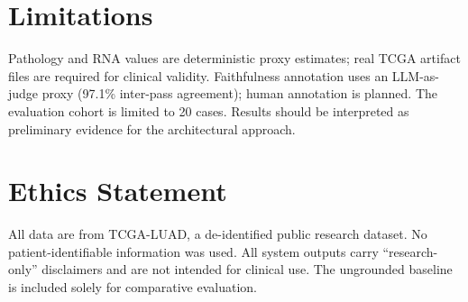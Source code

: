 \documentclass[11pt,twocolumn]{article}
\begin{document}
\section*{Limitations}

Pathology and RNA values are deterministic proxy estimates; real TCGA artifact files are required for clinical validity. Faithfulness annotation uses an LLM-as-judge proxy (97.1\% inter-pass agreement); human annotation is planned. The evaluation cohort is limited to 20 cases. Results should be interpreted as preliminary evidence for the architectural approach.

\section*{Ethics Statement}

All data are from TCGA-LUAD, a de-identified public research dataset. No patient-identifiable information was used. All system outputs carry ``research-only'' disclaimers and are not intended for clinical use. The ungrounded baseline is included solely for comparative evaluation.
\end{document}
